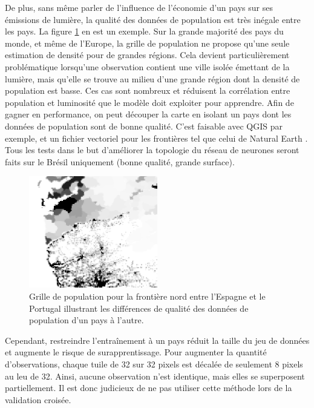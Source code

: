 \documentclass[a4paper, 11pt]{report}
\begin{document}
De plus, sans même parler de l'influence de l'économie d'un pays sur ses émissions de lumière, la qualité des données de population est très inégale entre les pays. La figure \ref{spain-portugal} en est un exemple. Sur la grande majorité des pays du monde, et même de l'Europe, la grille de population ne propose qu'une seule estimation de densité pour de grandes régions. Cela devient particulièrement problématique lorsqu'une observation contient une ville isolée émettant de la lumière, mais qu'elle se trouve au milieu d'une grande région dont la densité de population est basse. Ces cas sont nombreux et réduisent la corrélation entre population et luminosité que le modèle doit exploiter pour apprendre. Afin de gagner en performance, on peut découper la carte en isolant un pays dont les données de population sont de bonne qualité. C'est faisable avec QGIS par exemple, et un fichier vectoriel pour les frontières tel que celui de Natural Earth \cite{naturalearthdata}. Tous les tests dans le but d'améliorer la topologie du réseau de neurones seront faits sur le Brésil uniquement (bonne qualité, grande surface).

\begin{figure}
	\centering
	\includegraphics[width=0.5\textwidth]{img/spain-portugal.png}
	\caption{Grille de population pour la frontière nord entre l'Espagne et le Portugal illustrant les différences de qualité des données de population d'un pays à l'autre.}
	\label{spain-portugal}
\end{figure}

Cependant, restreindre l'entraînement à un pays réduit la taille du jeu de données et augmente le risque de surapprentissage. Pour augmenter la quantité d'observations, chaque tuile de 32 sur 32 pixels est décalée de seulement 8 pixels au leu de 32. Ainsi, aucune observation n'est identique, mais elles se superposent partiellement. Il est donc judicieux de ne pas utiliser cette méthode lors de la validation croisée.
\end{document}
